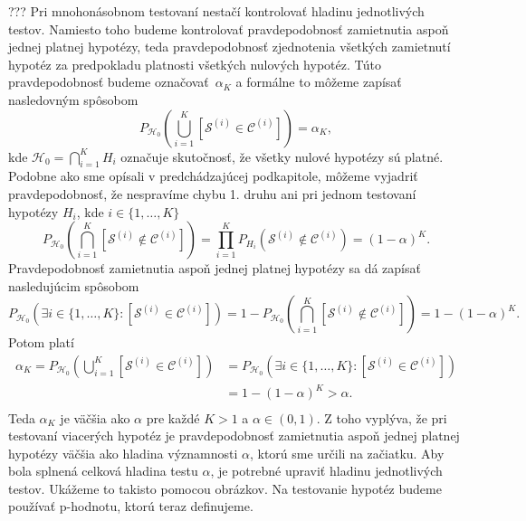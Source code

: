 ??? Pri mnohonásobnom testovaní nestačí kontrolovať hladinu jednotlivých testov. 
Namiesto toho budeme kontrolovať pravdepodobnosť zamietnutia aspoň jednej platnej hypotézy, 
teda pravdepodobnosť zjednotenia všetkých zamietnutí hypotéz 
za predpokladu platnosti všetkých nulových hypotéz. 
Túto pravdepodobnosť budeme označovať~$\alpha_K$ a formálne to môžeme zapísať nasledovným spôsobom 
$$ P_{\mathcal{H}_0} \left( \bigcup_{i=1}^{K} \left[ \mathcal{S}^{(i)} \in \mathcal{C}^{(i)} \right] \right) = \alpha_K, $$
kde $\mathcal{H}_0 = {\bigcap_{i=1}^{K} H_i}$ označuje skutočnosť, že všetky nulové hypotézy sú platné. 
Podobne ako sme opísali v predchádzajúcej podkapitole, môžeme vyjadriť pravdepodobnosť, 
že nespravíme chybu 1. druhu ani pri jednom testovaní hypotézy $H_i$, kde $i \in \{1, \dots, K\}$ 
$$ P_{\mathcal{H}_0} \left( \bigcap_{i=1}^{K} \left[ \mathcal{S}^{(i)} \notin \mathcal{C}^{(i)} \right] \right) 
= \prod_{i=1}^{K} P_{H_i} \left( \mathcal{S}^{(i)} \notin \mathcal{C}^{(i)} \right)
= (1 - \alpha)^K. $$ 
Pravdepodobnosť zamietnutia aspoň jednej platnej hypotézy sa dá zapísať nasledujúcim spôsobom
$$ P_{\mathcal{H}_0} \left( \exists i \in \{1, \dots, K\}: \left[ \mathcal{S}^{(i)} \in \mathcal{C}^{(i)} \right] \right) 
   = 1 - P_{\mathcal{H}_0} \left( \bigcap_{i=1}^{K} [\mathcal{S}^{(i)} \notin \mathcal{C}^{(i)}] \right) = 1 - (1 - \alpha)^K. $$ 
Potom platí 
\begin{align*} 
\alpha_K = P_{\mathcal{H}_0} \left( \bigcup_{i=1}^{K} \left[ \mathcal{S}^{(i)} \in \mathcal{C}^{(i)} \right] \right)
& =  P_{\mathcal{H}_0} \left( \exists i \in \{1, \dots, K\}: \left[ \mathcal{S}^{(i)} \in \mathcal{C}^{(i)} \right] \right) \\
& = 1 - (1 - \alpha)^K > \alpha. \\
\end{align*}
Teda $\alpha_K$ je väčšia ako $\alpha$ pre každé $K > 1$ a $\alpha \in (0,1)$.
Z toho vyplýva, že pri testovaní viacerých hypotéz je pravdepodobnosť zamietnutia aspoň jednej platnej hypotézy 
väčšia ako hladina významnosti $\alpha$, ktorú sme určili na začiatku. 
Aby bola splnená celková hladina testu $\alpha$, je potrebné upraviť hladinu jednotlivých testov. 
Ukážeme to takisto pomocou obrázkov. 
Na testovanie hypotéz budeme používať p-hodnotu, ktorú teraz definujeme. 

